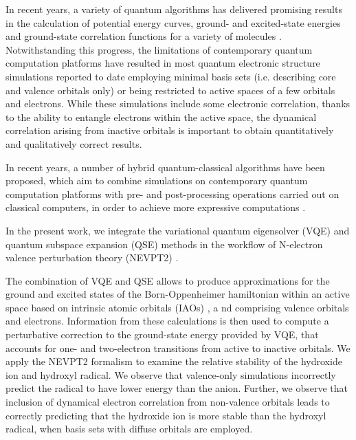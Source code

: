 \documentclass[aps,pra,twocolumn]{revtex4-2}
\begin{document}
In recent years, a variety of quantum algorithms has delivered promising results in the calculation of potential energy curves,
ground- and excited-state energies and ground-state correlation functions for a variety of molecules \cite{cao2019quantum,cerezo2020variational,bauer2020quantum,mcardle2020quantum,motta2021emerging}.
Notwithstanding this progress, the limitations of contemporary quantum computation platforms 
have resulted in most quantum electronic structure simulations reported to date employing minimal basis sets (i.e. describing core and valence orbitals only)
or being restricted to active spaces of a few orbitals and electrons.
While these simulations include some electronic correlation, thanks to the ability to entangle electrons within the active space, 
the dynamical correlation arising from inactive orbitals is important to obtain quantitatively and qualitatively correct results.

In recent years, a number of hybrid quantum-classical algorithms have been proposed, 
which aim to combine simulations on contemporary quantum computation platforms with pre- and post-processing operations carried out on classical computers, 
in order to achieve more expressive computations
\cite{bravyi2016trading,kreula2016few,yamazaki2018towards,peng2020simulating,takeshita2020increasing,kawashima2021optimizing,mitarai2021constructing,yuan2021quantum,eddins2021doubling}.

In the present work, we integrate the variational quantum eigensolver (VQE) \cite{farhi2014quantum,peruzzo2014variational,mcclean2016theory,romero2018strategies}
and quantum subspace expansion (QSE) \cite{mcclean2017hybrid,colless2018computation,huggins2020non}
methods in the workflow of N-electron valence perturbation theory (NEVPT2) \cite{angeli2001introduction,angeli2001n,sokolov2016time,sokolov2017time}.

The combination of VQE and QSE allows to produce approximations for the ground and excited states of the Born-Oppenheimer hamiltonian within an active space
based on intrinsic atomic orbitals (IAOs) \cite{knizia2013intrinsic,senjean2020generalization,schwilkIAO,ManzIAO,WestIAO,ElviraIAO,SchneiderIAO,barison2020quantum}, a
nd comprising valence orbitals and electrons.
Information from these calculations is then used to compute a perturbative correction to the ground-state energy provided by VQE,
that accounts for one- and two-electron transitions from active to inactive orbitals.
We apply the NEVPT2 formalism to examine the relative stability of the hydroxide ion and hydroxyl radical. 
We observe that valence-only simulations incorrectly predict the radical to have lower energy than the anion. 
Further, we observe that inclusion of dynamical electron correlation from non-valence orbitals leads to correctly predicting that the hydroxide ion is more stable
than the hydroxyl radical, when basis sets with diffuse orbitals are employed.
\end{document}
